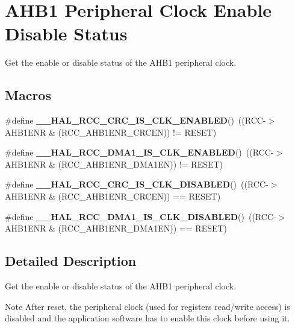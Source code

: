 \hypertarget{group___r_c_c___a_h_b1___peripheral___clock___enable___disable___status}{}\section{A\+H\+B1 Peripheral Clock Enable Disable Status}
\label{group___r_c_c___a_h_b1___peripheral___clock___enable___disable___status}


Get the enable or disable status of the A\+H\+B1 peripheral clock.  


\subsection*{Macros}
\begin{DoxyCompactItemize}
\item 
\mbox{\label{group___r_c_c___a_h_b1___peripheral___clock___enable___disable___status_ga0e1b25cbf589c1c47c1d069e4c803d56}} 
\#define {\bfseries \+\_\+\+\_\+\+H\+A\+L\+\_\+\+R\+C\+C\+\_\+\+C\+R\+C\+\_\+\+I\+S\+\_\+\+C\+L\+K\+\_\+\+E\+N\+A\+B\+L\+ED}()~((R\+CC-\/$>$A\+H\+B1\+E\+NR \& (R\+C\+C\+\_\+\+A\+H\+B1\+E\+N\+R\+\_\+\+C\+R\+C\+EN)) != R\+E\+S\+ET)
\item 
\mbox{\label{group___r_c_c___a_h_b1___peripheral___clock___enable___disable___status_gaab05e603c9cadd72e4b6397837b46cef}} 
\#define {\bfseries \+\_\+\+\_\+\+H\+A\+L\+\_\+\+R\+C\+C\+\_\+\+D\+M\+A1\+\_\+\+I\+S\+\_\+\+C\+L\+K\+\_\+\+E\+N\+A\+B\+L\+ED}()~((R\+CC-\/$>$A\+H\+B1\+E\+NR \& (R\+C\+C\+\_\+\+A\+H\+B1\+E\+N\+R\+\_\+\+D\+M\+A1\+EN)) != R\+E\+S\+ET)
\item 
\mbox{\label{group___r_c_c___a_h_b1___peripheral___clock___enable___disable___status_ga3d2645916b9ee9bad8c724a719c621d9}} 
\#define {\bfseries \+\_\+\+\_\+\+H\+A\+L\+\_\+\+R\+C\+C\+\_\+\+C\+R\+C\+\_\+\+I\+S\+\_\+\+C\+L\+K\+\_\+\+D\+I\+S\+A\+B\+L\+ED}()~((R\+CC-\/$>$A\+H\+B1\+E\+NR \& (R\+C\+C\+\_\+\+A\+H\+B1\+E\+N\+R\+\_\+\+C\+R\+C\+EN)) == R\+E\+S\+ET)
\item 
\mbox{\label{group___r_c_c___a_h_b1___peripheral___clock___enable___disable___status_gae89d94d6252c79e450623f69eb939ed6}} 
\#define {\bfseries \+\_\+\+\_\+\+H\+A\+L\+\_\+\+R\+C\+C\+\_\+\+D\+M\+A1\+\_\+\+I\+S\+\_\+\+C\+L\+K\+\_\+\+D\+I\+S\+A\+B\+L\+ED}()~((R\+CC-\/$>$A\+H\+B1\+E\+NR \& (R\+C\+C\+\_\+\+A\+H\+B1\+E\+N\+R\+\_\+\+D\+M\+A1\+EN)) == R\+E\+S\+ET)
\end{DoxyCompactItemize}


\subsection{Detailed Description}
Get the enable or disable status of the A\+H\+B1 peripheral clock. 

\begin{DoxyNote}{Note}
After reset, the peripheral clock (used for registers read/write access) is disabled and the application software has to enable this clock before using it. 
\end{DoxyNote}

